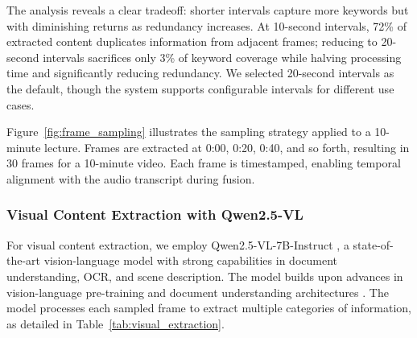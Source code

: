 The analysis reveals a clear tradeoff: shorter intervals capture more keywords but with diminishing returns as redundancy increases. At 10-second intervals, 72\% of extracted content duplicates information from adjacent frames; reducing to 20-second intervals sacrifices only 3\% of keyword coverage while halving processing time and significantly reducing redundancy. We selected 20-second intervals as the default, though the system supports configurable intervals for different use cases.

%
%    
%
%

Figure~\ref{fig:frame_sampling} illustrates the sampling strategy applied to a 10-minute lecture. Frames are extracted at 0:00, 0:20, 0:40, and so forth, resulting in 30 frames for a 10-minute video. Each frame is timestamped, enabling temporal alignment with the audio transcript during fusion.

\subsubsection{Visual Content Extraction with Qwen2.5-VL}

For visual content extraction, we employ Qwen2.5-VL-7B-Instruct \cite{Wang2024Qwen2VL}, a state-of-the-art vision-language model with strong capabilities in document understanding, OCR, and scene description. The model builds upon advances in vision-language pre-training \cite{Radford2021, Li2023BLIP2} and document understanding architectures \cite{Xu2020LayoutLM}. The model processes each sampled frame to extract multiple categories of information, as detailed in Table~\ref{tab:visual_extraction}.

